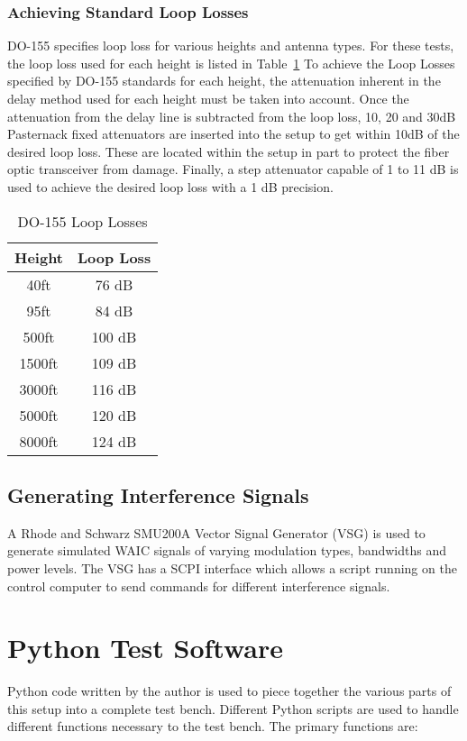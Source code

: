 \subsubsection{Achieving Standard Loop Losses}
DO-155 specifies loop loss for various heights and antenna types. For these tests, the loop loss used for each height is listed in Table~\ref{tab:loop loss} To achieve the Loop Losses specified by DO-155 standards for each height, the attenuation inherent in the delay method used for each height must be taken into account. Once the attenuation from the delay line is subtracted from the loop loss, 10, 20 and 30dB Pasternack fixed attenuators are inserted into the setup to get within 10dB of the desired loop loss. These are located within the setup in part to protect the fiber optic transceiver from damage.  Finally, a step attenuator capable of 1 to 11 dB is used to achieve the desired loop loss with a 1 dB precision. 

\begin{table}[]
\centering
\begin{tabular}{|c|c|}
\hline
\textbf{Height} & \textbf{Loop Loss} \\ \hline
40ft            & 76 dB              \\ \hline
95ft            & 84 dB              \\ \hline
500ft           & 100 dB             \\ \hline
1500ft          & 109 dB             \\ \hline
3000ft          & 116 dB             \\ \hline
5000ft          & 120 dB             \\ \hline
8000ft          & 124 dB             \\ \hline
\end{tabular}
\caption{DO-155 Loop Losses}
\label{tab:loop loss}
\end{table}

\subsection{Generating Interference Signals}
A Rhode and Schwarz SMU200A Vector Signal Generator (VSG) is used to generate simulated WAIC signals of varying modulation types, bandwidths and power levels. The VSG has a SCPI interface which allows a script running on the control computer to send commands for different interference signals. 

\section{Python Test Software}
Python code written by the author is used to piece together the various parts of this setup into a complete test bench. Different Python scripts are used to handle different functions necessary to the test bench. The primary functions are:

